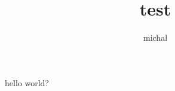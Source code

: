 \documentclass{article}
\title{test}
\author{michal}
\begin{document}
\maketitle
hello world?
\end{document}
